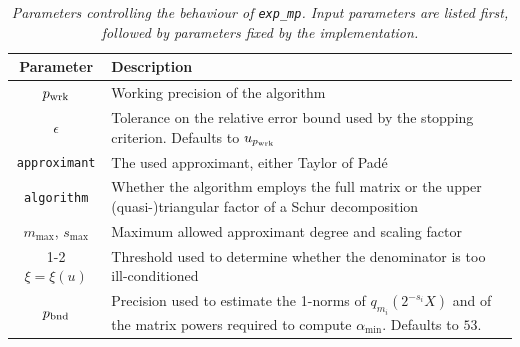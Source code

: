 \begin{table}[htp]
	\centering
	\caption{\emph{Parameters controlling the behaviour of \emph{\texttt{exp\_mp}}. Input parameters are listed first, followed by parameters fixed by the implementation.}}
	\label{tab:exp_mp_parameters}
	\begin{tabularx}{\textwidth}{cX}
	\toprule 
		\textbf{Parameter} & \textbf{Description}\\
	\midrule 
		$p_{\textup{wrk}}$		& Working precision of the algorithm\\
		$\epsilon$ & Tolerance on the relative error bound used by the stopping criterion. Defaults to $u_{p_{\textup{wrk}}}$\\
		\texttt{approximant} & The used approximant, either Taylor of Padé \\
		\texttt{algorithm} & Whether the algorithm employs the full matrix or the upper (quasi-)triangular factor of a Schur decomposition\\
		$m_{\max}$, $s_{\max}$ & Maximum allowed approximant degree and scaling factor\\
	\cmidrule(lr){1-2} 	
		$\xi=\xi(u)$ & Threshold used to determine whether the denominator is too ill-conditioned\\
		$p_{\textup{bnd}}$ & Precision used to estimate the 1-norms of $q_{m_i}(2^{-s_i}X)$ and of the matrix powers required to compute $\alpha_{\min}$. Defaults to $53$.\\
	\bottomrule
	\end{tabularx}
\end{table}


